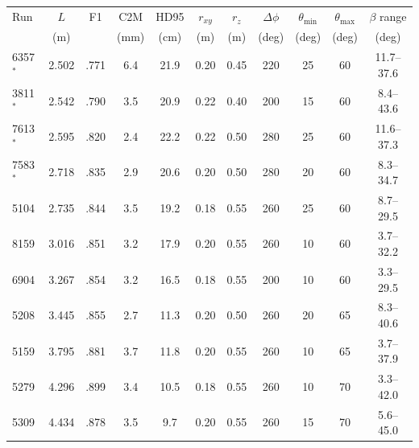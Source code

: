 \begin{tabular}{@{}lcccccccccc@{}}
\toprule
Run & $L$ & F1 & C2M & HD95 & $r_{xy}$ & $r_z$ & $\Delta\phi$ & $\theta_{\min}$ & $\theta_{\max}$ & $\beta$ range \\
 & (m) & & (mm) & (cm) & (m) & (m) & (deg) & (deg) & (deg) & (deg) \\
\midrule
6357$^{\ast}$ & 2.502 & .771 & 6.4 & 21.9 & 0.20 & 0.45 & 220 & 25 & 60 & 11.7--37.6 \\
3811$^{\ast}$ & 2.542 & .790 & 3.5 & 20.9 & 0.22 & 0.40 & 200 & 15 & 60 & 8.4--43.6 \\
7613$^{\ast}$ & 2.595 & .820 & 2.4 & 22.2 & 0.22 & 0.50 & 280 & 25 & 60 & 11.6--37.3 \\
7583$^{\ast}$ & 2.718 & .835 & 2.9 & 20.6 & 0.20 & 0.50 & 280 & 20 & 60 & 8.3--34.7 \\
5104 & 2.735 & .844 & 3.5 & 19.2 & 0.18 & 0.55 & 260 & 25 & 60 & 8.7--29.5 \\
8159 & 3.016 & .851 & 3.2 & 17.9 & 0.20 & 0.55 & 260 & 10 & 60 & 3.7--32.2 \\
6904 & 3.267 & .854 & 3.2 & 16.5 & 0.18 & 0.55 & 200 & 10 & 60 & 3.3--29.5 \\
5208 & 3.445 & .855 & 2.7 & 11.3 & 0.20 & 0.50 & 260 & 20 & 65 & 8.3--40.6 \\
5159 & 3.795 & .881 & 3.7 & 11.8 & 0.20 & 0.55 & 260 & 10 & 65 & 3.7--37.9 \\
5279 & 4.296 & .899 & 3.4 & 10.5 & 0.18 & 0.55 & 260 & 10 & 70 & 3.3--42.0 \\
5309 & 4.434 & .878 & 3.5 & 9.7 & 0.20 & 0.55 & 260 & 15 & 70 & 5.6--45.0 \\
\bottomrule
\end{tabular}
